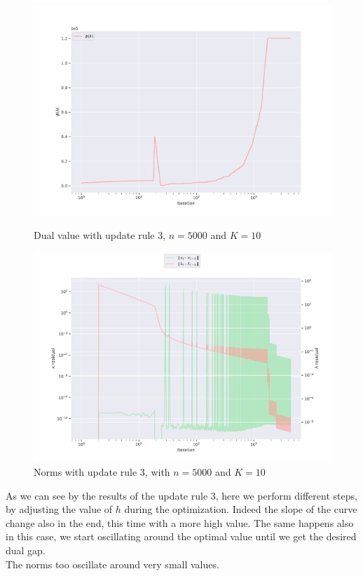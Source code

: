 \documentclass[notitlepage]{article}
\begin{document}
\begin{figure}[H]
  \begin{minipage}{0.49\textwidth}
    \centering
    \includegraphics[scale=0.33]{pics/n=5000_K=10_dual_rule=3.png}
    \caption{Dual value with update rule $3$, $n=5000$ and $K=10$}
    \label{fig:rule-3-n-5000-k-10-dual}
  \end{minipage}
  \begin{minipage}{0.49\textwidth}
    \centering
    \includegraphics[scale=0.33]{pics/n=5000_K=10_lambda_rule=3.png}
    \caption{Norms with update rule $3$, with $n=5000$ and $K=10$}
    \label{fig:rule-3-n-5000-k-10-norm}
  \end{minipage}  
\end{figure}

\begin{changemargin}{3.5cm}{3.5cm}
  As we can see by the results of the update rule 3, here we perform different steps, by adjusting the value of $h$ during the optimization. Indeed the slope of the curve
  change also in the end, this time with a more high value. The same happens also in this case, we start oscillating around the optimal value until we get the desired dual gap.\\
  The norms too oscillate around very small values.
\end{changemargin}
\end{document}
